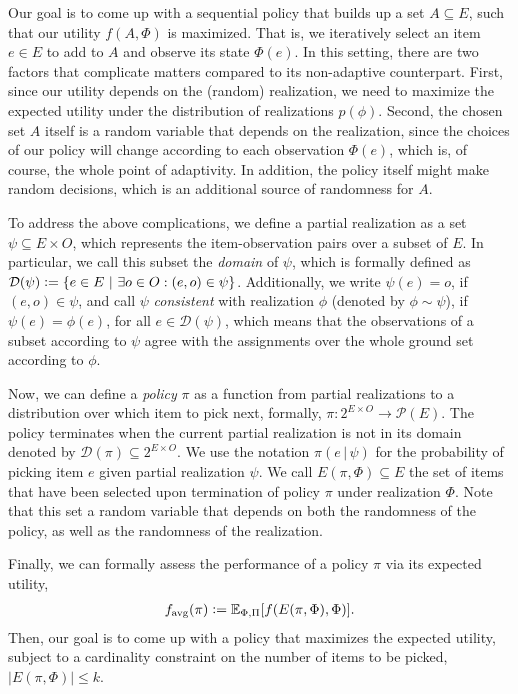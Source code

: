 \documentclass{article}
\newcommand{\defeq}{\vcentcolon=}
\let\originalleft\left
\let\originalright\right
\renewcommand{\left}{\mathopen{}\mathclose\bgroup\originalleft}
\renewcommand{\right}{\aftergroup\egroup\originalright}
\newcommand{\smid}{\ \middle\vert\ }
\newcommand{\mmid}{\,\vert\,}
\newcommand{\sdef}[2]{\left\{#1\smid#2\right\}}
\newcommand{\favg}{f_{\mathrm{avg}}}
\newcommand{\dom}{\mathcal{D}}
\begin{document}
Our goal is to come up with a sequential policy that builds up a set $A \subseteq E$, such that our utility $f(A, \Phi)$ is maximized.
That is, we iteratively select an item $e \in E$ to add to $A$ and observe its state $\Phi(e)$.
In this setting, there are two factors that complicate matters compared to its non-adaptive counterpart.
First, since our utility depends on the (random) realization, we need to maximize the expected utility under the distribution of realizations $p(\phi)$.
Second, the chosen set $A$ itself is a random variable that depends on the realization, since the choices of our policy will change according to each observation $\Phi(e)$, which is, of course, the whole point of adaptivity.
In addition, the policy itself might make random decisions, which is an additional source of randomness for $A$.

To address the above complications, we define a partial realization as a set $ \psi \subseteq E \times O$, which represents the item-observation pairs over a subset of $E$.
In particular, we call this subset the \emph{domain} of $\psi$, which is formally defined as $\dom(\psi) \defeq \sdef{e \in E}{\exists o \in O : (e, o) \in \psi}$.
Additionally, we write $\psi(e) = o$, if $(e, o) \in \psi$, and call $\psi$ \emph{consistent} with realization $\phi$ (denoted by $\phi \sim \psi$), if $\psi(e) = \phi(e)$, for all $e \in \dom(\psi)$, which means that the observations of a subset according to $\psi$ agree with the assignments over the whole ground set according to $\phi$.

Now, we can define a \emph{policy} $\pi$ as a function from partial realizations to a distribution over which item to pick next, formally, $\pi : 2^{E \times O} \to \mathcal{P}(E)$.
The policy terminates when the current partial realization is not in its domain denoted by $\dom(\pi) \subseteq 2^{E \times O}$.
We use the notation $\pi(e\mmid\psi)$ for the probability of picking item $e$ given partial realization $\psi$.
We call $E(\pi, \Phi) \subseteq E$ the set of items that have been selected upon termination of policy $\pi$ under realization $\Phi$.
Note that this set a random variable that depends on both the randomness of the policy, as well as the randomness of the realization.

Finally, we can formally assess the performance of a policy $\pi$ via its expected utility,
\begin{align*}
  \favg(\pi) \defeq \E[\Phi,\Pi]{f(E(\pi, \Phi), \Phi)}.
\end{align*}
Then, our goal is to come up with a policy that maximizes the expected utility, subject to a cardinality constraint on the number of items to be picked, $|E(\pi, \Phi)| \leq k$.
\end{document}
